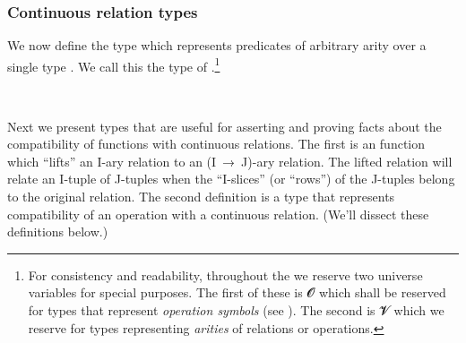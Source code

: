 \subsubsection{Continuous relation types}\label{continuous-relation-types}

We now define the type  which represents predicates of arbitrary arity over a single type . We call this the type of .\footnote{%
For consistency and readability, throughout the \ualib we reserve two universe variables for special purposes. The first of these is 𝓞 which shall be reserved for types that represent \emph{operation symbols} (see ). The second is 𝓥 which we reserve for types representing \emph{arities} of relations or operations.}
\ccpad
\begin{code}%
\>[0]\AgdaSpace{}%
\AgdaSymbol{:}\AgdaSpace{}%
\AgdaSpace{}%
\AgdaSpace{}%
\AgdaSpace{}%
\AgdaSpace{}%
\AgdaSpace{}%
\AgdaSpace{}%
\AgdaSymbol{(}\AgdaSpace{}%
\AgdaSymbol{:}\AgdaSpace{}%
\AgdaSymbol{)}\AgdaSpace{}%
\AgdaSpace{}%
\AgdaSpace{}%
\AgdaSpace{}%
\AgdaSpace{}%
\AgdaSpace{}%
\AgdaSpace{}%
\AgdaSpace{}%
\<%
\\
\>[0]\AgdaSpace{}%
\AgdaSpace{}%
\AgdaSpace{}%
\AgdaSpace{}%
\AgdaSymbol{=}\AgdaSpace{}%
\AgdaSymbol{(}\AgdaSpace{}%
\AgdaSpace{}%
\AgdaSymbol{)}\AgdaSpace{}%
\AgdaSpace{}%
\AgdaSpace{}%
\<%
\end{code}
\ccpad
Next we present types that are useful for asserting and proving facts about the compatibility of functions with continuous relations. The first is an  function which ``lifts'' an \ab I-ary relation to an (\ab I~\as →~\ab J)-ary relation. The lifted relation will relate an \ab I-tuple of \ab J-tuples when the ``\ab I-slices'' (or ``rows'') of the \ab J-tuples belong to the original relation. The second definition is a type that represents compatibility of an operation with a continuous relation. (We'll dissect these definitions below.)
